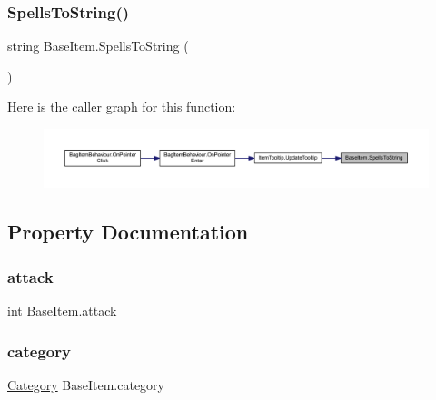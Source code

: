 \mbox{\label{class_base_item_a7b49af5c45c493b9ea7319de44c6c138}} 
\subsubsection{\texorpdfstring{SpellsToString()}{SpellsToString()}}
{\footnotesize\ttfamily string Base\+Item.\+Spells\+To\+String (\begin{DoxyParamCaption}{ }\end{DoxyParamCaption})}

Here is the caller graph for this function\+:
\nopagebreak
\begin{figure}[H]
\begin{center}
\leavevmode
\includegraphics[width=350pt]{class_base_item_a7b49af5c45c493b9ea7319de44c6c138_icgraph}
\end{center}
\end{figure}


\subsection{Property Documentation}
\mbox{\label{class_base_item_a2b98fdf99b6c7ef2ae183c377245b133}} 
\subsubsection{\texorpdfstring{attack}{attack}}
{\footnotesize\ttfamily int Base\+Item.\+attack\hspace{0.3cm}{\ttfamily [get]}}

\mbox{\label{class_base_item_a219878018445243d4fc30538548b7425}} 
\subsubsection{\texorpdfstring{category}{category}}
{\footnotesize\ttfamily \mbox{\hyperlink{class_base_item_a882a2962396f880c2e23755437245d37}{Category}} Base\+Item.\+category\hspace{0.3cm}{\ttfamily [get]}}

